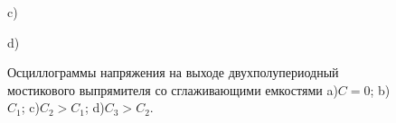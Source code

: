 \documentclass[12pt]{article}
\begin{document}
\begin{figure}[H]
\begin{minipage}[h]{0.47\linewidth}
		 c) \\
	\end{minipage}
	\hfill
	\begin{minipage}[h]{0.47\linewidth}
		 d) \\
	\end{minipage}
	\caption{Осциллограммы напряжения на выходе двухполупериодный мостикового выпрямителя со сглаживающими емкостями a)$C = 0$; b)$C_1$; c)$C_2 > C_1$; d)$C_3 > C_2$.}
	\label{ris:image6}
\end{figure}
\end{document}
